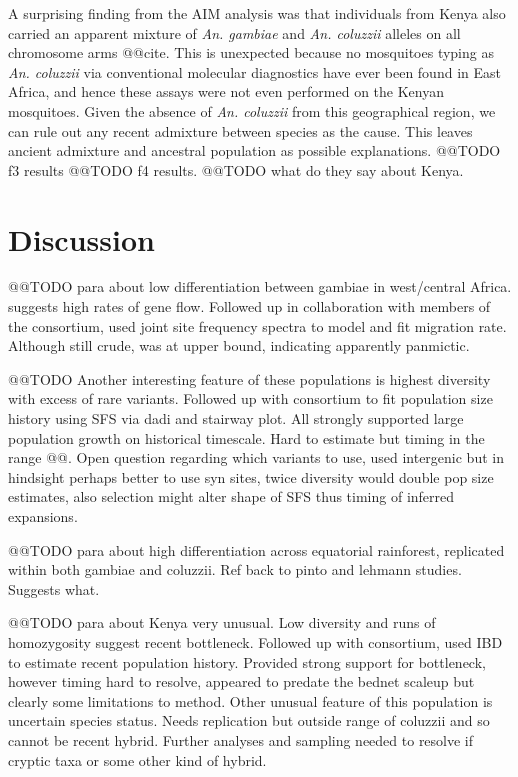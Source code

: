 \documentclass[a4paper,11pt,abstracton,hidelinks]{scrartcl}
\begin{document}
A surprising finding from the AIM analysis was that individuals from Kenya also carried an apparent mixture of \textit{An. gambiae} and \textit{An. coluzzii} alleles on all chromosome arms @@cite.
%
This is unexpected because no mosquitoes typing as \textit{An. coluzzii} via conventional molecular diagnostics have ever been found in East Africa, and hence these assays were not even performed on the Kenyan mosquitoes.
%
Given the absence of \textit{An. coluzzii} from this geographical region, we can rule out any recent admixture between species as the cause.
%
This leaves ancient admixture and ancestral population as possible explanations.
%
@@TODO f3 results
%
@@TODO f4 results.
%
@@TODO what do they say about Kenya.


\section{Discussion}\label{sec:discussion}


@@TODO para about low differentiation between gambiae in west/central Africa. suggests high rates of gene flow. Followed up in collaboration with members of the consortium, used joint site frequency spectra to model and fit migration rate. Although still crude, was at upper bound, indicating apparently panmictic.


@@TODO Another interesting feature of these populations is highest diversity with excess of rare variants. Followed up with consortium to fit population size history using SFS via dadi and stairway plot. All strongly supported large population growth on historical timescale. Hard to estimate but timing in the range @@. Open question regarding which variants to use, used intergenic but in hindsight perhaps better to use syn sites, twice diversity would double pop size estimates, also selection might alter shape of SFS thus timing of inferred expansions.


@@TODO para about high differentiation across equatorial rainforest, replicated within both gambiae and coluzzii. Ref back to pinto and lehmann studies. Suggests what.


@@TODO para about Kenya very unusual. Low diversity and runs of homozygosity suggest recent bottleneck. Followed up with consortium, used IBD to estimate recent population history. Provided strong support for bottleneck, however timing hard to resolve, appeared to predate the bednet scaleup but clearly some limitations to method. Other unusual feature of this population is uncertain species status. Needs replication but outside range of coluzzii and so cannot be recent hybrid. Further analyses and sampling needed to resolve if cryptic taxa or some other kind of hybrid.
\end{document}
